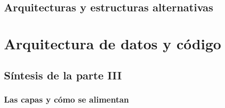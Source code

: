\documentclass[11pt,openany]{report}
\newcommand{\parte}[2]{\part{#1}\label{#2}}
\begin{document}
\chapter{Arquitecturas y estructuras alternativas}\label{cap:alternativas}


\parte{Arquitectura de datos y código}{parte:datosarq}

\chapter*{Síntesis de la parte III}

\section*{Las capas y cómo se alimentan}
\end{document}
